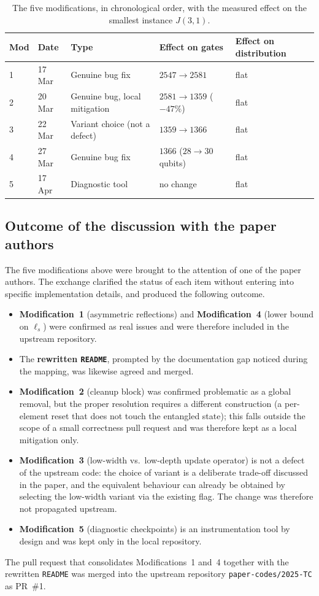 \documentclass[11pt,a4paper]{article}
\begin{document}
\begin{table}[H]
\centering
\footnotesize
\begin{tabular}{@{}l l l l l@{}}
\toprule
\textbf{Mod} & \textbf{Date} & \textbf{Type} &
\textbf{Effect on gates} & \textbf{Effect on distribution}\\
\midrule
1 & 17 Mar & Genuine bug fix & $2547 \to 2581$ & flat \\
2 & 20 Mar & Genuine bug, local mitigation & $2581 \to 1359$ ($-47\%$) & flat \\
3 & 22 Mar & Variant choice (not a defect)  & $1359 \to 1366$ & flat \\
4 & 27 Mar & Genuine bug fix & $1366$ ($28 \to 30$ qubits) & flat \\
5 & 17 Apr & Diagnostic tool & no change & flat  \\
\bottomrule
\end{tabular}
\caption{The five modifications, in chronological order, with the
measured effect on the smallest instance $J(3,1)$.}
\label{tab:mods}
\end{table}

\subsection{Outcome of the discussion with the paper authors}

The five modifications above were brought to the attention of one
of the paper authors. The exchange clarified the status of each
item without entering into specific implementation details, and
produced the following outcome.
\begin{itemize}[leftmargin=1.2em]
\item \textbf{Modification~1} (asymmetric reflections) and
\textbf{Modification~4} (lower bound on $\ell_s$) were confirmed
as real issues and were therefore included in the upstream
repository.
\item The \textbf{rewritten \texttt{README}}, prompted by the
documentation gap noticed during the mapping, was likewise
agreed and merged.
\item \textbf{Modification~2} (cleanup block) was confirmed
problematic as a global removal, but the proper resolution
requires a different construction (a per-element reset that does
not touch the entangled state); this falls outside the scope of
a small correctness pull request and was therefore kept as a
local mitigation only.
\item \textbf{Modification~3} (low-width vs.~low-depth update
operator) is not a defect of the upstream code: the choice of
variant is a deliberate trade-off discussed in the paper, and
the equivalent behaviour can already be obtained by selecting
the low-width variant via the existing flag. The change was
therefore not propagated upstream.
\item \textbf{Modification~5} (diagnostic checkpoints) is an
instrumentation tool by design and was kept only in the local
repository.
\end{itemize}
The pull request that consolidates Modifications~1 and~4
together with the rewritten \texttt{README} was merged into the
upstream repository \texttt{paper-codes/2025-TC} as
PR~\#1.
\end{document}
